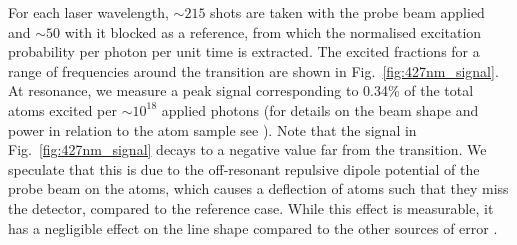 \documentclass[%
 reprint,
 amsmath,amssymb,
 aps,
 prl,
]{revtex4-2}
\newcommand{\brycecom}[1]{{\color{ProcessBlue}[{#1}]\normalcolor}} %
\begin{document}

For each laser wavelength, \(\sim\)\(215\) shots are taken with the probe beam applied and \(\sim\)\(50\) with it blocked as a reference, from which the normalised excitation probability per photon per unit time \cite{SOMs} is extracted. The excited fractions for a range of frequencies around the transition are shown in Fig.~\ref{fig:427nm_signal}.  At resonance, we measure a peak signal corresponding to 0.34\% of the total atoms excited per \(\sim\)\(10^{18}\) applied photons (for details on the beam shape and power in relation to the atom sample see \cite{SOMs}).  Note that the signal in Fig.~\ref{fig:427nm_signal} decays to a negative value far from the transition.  We speculate that this is due to the off-resonant repulsive dipole potential of the probe beam on the atoms, which causes a deflection of atoms such that they miss the detector, compared to the reference case.  While this effect is measurable, it has a negligible effect on the line shape compared to the other sources of error \cite{SOMs}. 


\end{document}
